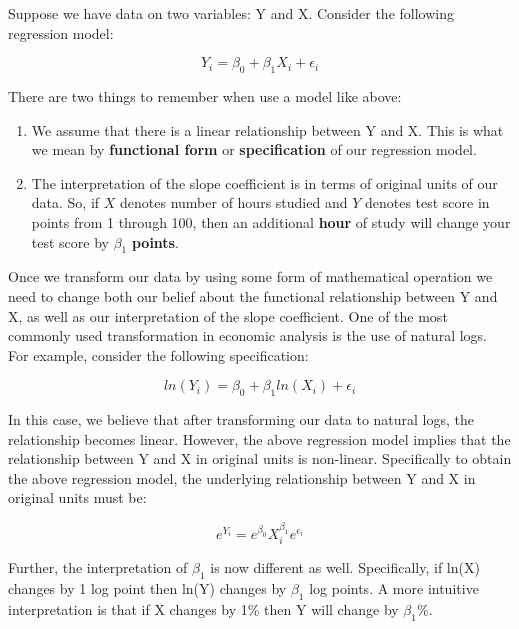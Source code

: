 \documentclass[
]{book}
\theoremstyle{definition}
\theoremstyle{definition}
\theoremstyle{definition}
\theoremstyle{definition}
\theoremstyle{remark}
\begin{document}
Suppose we have data on two variables: Y and X. Consider the following regression model:

\[Y_i = \beta_0 + \beta_1 X_i + \epsilon_i\]

There are two things to remember when use a model like above:

\begin{enumerate}
\def\labelenumi{\arabic{enumi}.}
\item
  We assume that there is a linear relationship between Y and X. This is what we mean by \textbf{functional form} or \textbf{specification} of our regression model.
\item
  The interpretation of the slope coefficient is in terms of original units of our data. So, if \(X\) denotes number of hours studied and \(Y\) denotes test score in points from 1 through 100, then an additional \textbf{hour} of study will change your test score by \(\beta_1\) \textbf{points}.
\end{enumerate}

Once we transform our data by using some form of mathematical operation we need to change both our belief about the functional relationship between Y and X, as well as our interpretation of the slope coefficient. One of the most commonly used transformation in economic analysis is the use of natural logs. For example, consider the following specification:

\[ln(Y_i)=\beta_0 + \beta_1 ln(X_i) + \epsilon_i\]

In this case, we believe that after transforming our data to natural logs, the relationship becomes linear. However, the above regression model implies that the relationship between Y and X in original units is non-linear. Specifically to obtain the above regression model, the underlying relationship between Y and X in original units must be:

\[e^{Y_i} = e^{\beta_0}X_i^{\beta_1}e^{\epsilon_i}\]

Further, the interpretation of \(\beta_1\) is now different as well. Specifically, if ln(X) changes by 1 log point then ln(Y) changes by \(\beta_1\) log points. A more intuitive interpretation is that if X changes by 1\% then Y will change by \(\beta_1\)\%.
\end{document}
